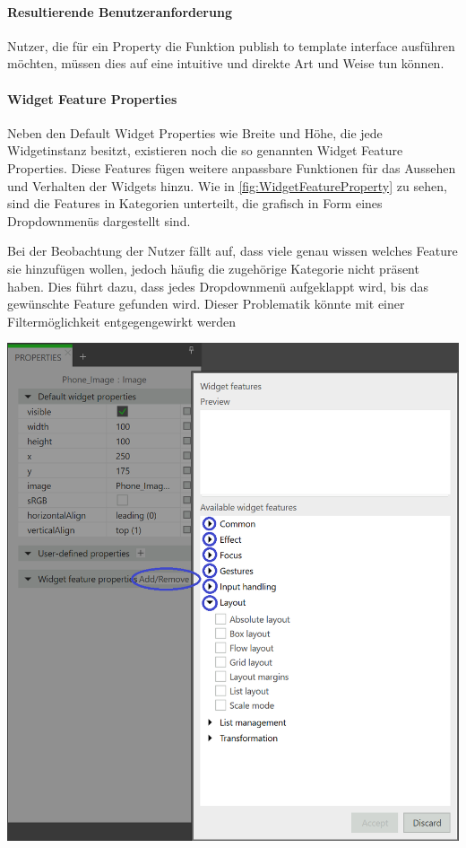 \paragraph{Resultierende Benutzeranforderung}
Nutzer, die für ein Property die Funktion \glqq publish to template interface\grqq{} ausführen möchten, müssen dies auf eine intuitive und direkte Art und Weise tun können.

\paragraph{Widget Feature Properties}

Neben den Default Widget Properties wie Breite und Höhe, die jede Widgetinstanz besitzt, existieren noch die so genannten Widget Feature Properties.
Diese Features fügen weitere anpassbare Funktionen für das Aussehen und Verhalten der Widgets hinzu.
Wie in \cref{fig:WidgetFeatureProperty} zu sehen, sind die Features in Kategorien unterteilt, die grafisch in Form eines Dropdownmenüs dargestellt sind.

Bei der Beobachtung der Nutzer fällt auf, dass viele genau wissen welches Feature sie hinzufügen wollen, jedoch häufig die zugehörige Kategorie nicht präsent haben.
Dies führt dazu, dass jedes Dropdownmenü aufgeklappt wird, bis das gewünschte Feature gefunden wird.
Dieser Problematik könnte mit einer Filtermöglichkeit entgegengewirkt werden

\begin{center}
  \includegraphics[scale=0.5]{figures/WidgetFeatureProperty.png}
  \label{fig:WidgetFeatureProperty}
\end{center}

